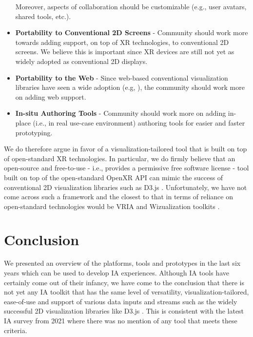 \documentclass{vgtc}                          %
\begin{document}
\begin{itemize}
          Moreover, aspects of collaboration should be customizable (e.g., user avatars, shared tools, etc.).
	\item \textbf{Portability to Conventional 2D Screens} - Community should
	      work more towards adding support, on top of XR technologies, to
	      conventional 2D screens. We believe this is important since XR
          devices are still not yet as widely adopted as conventional 2D displays.
	\item \textbf{Portability to the Web} - Since web-based conventional visualization libraries have seen a
          wide adoption (e.g, \cite{d3_js}), the community should work more on adding web support.
	\item \textbf{In-situ Authoring Tools} - Community should work more on adding in-place (i.e., in real
          use-case environment) authoring tools for easier and faster prototyping.
\end{itemize}

\noindent We do therefore argue in favor of a visualization-tailored tool that is built on top of
open-standard XR technologies. In particular, we do firmly believe that an open-source and free-to-use -
i.e., provides a permissive free software license - tool built on top of the open-standard OpenXR API can
mimic the success of conventional 2D visualization libraries such as D3.js \cite{d3_js}. Unfortunately, we
have not come across such a framework and the closest to that in terms of reliance on open-standard
technologies would be VRIA and Wizualization toolkits \cite{vria_framework, wizualization_toolkit}.

\section{Conclusion}
We presented an overview of the platforms, tools and prototypes in the last six years which can be used to
develop IA experiences. Although IA tools have certainly come out of their infancy, we have come to the
conclusion that there is not yet any IA toolkit that has the same level of versatility,
visualization-tailored, ease-of-use and support of various data inputs and streams such as the widely
successful 2D visualization libraries like D3.js \cite{d3_js}. This is consistent with the latest IA survey
from 2021 \cite{survey_of_ia} where there was no mention of any tool that meets these criteria.

\printbibliography
\end{document}
